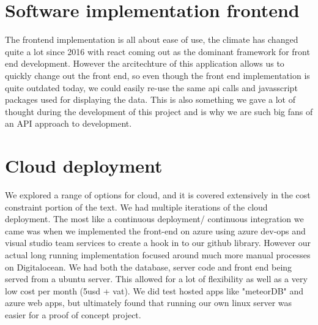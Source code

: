 \documentclass[]{uiophd}
\begin{document}
\section{Software implementation frontend}
The frontend implementation is all about ease of use, the climate has changed quite a lot since 2016 with react coming out as the dominant framework for front end development. However the arcitechture of this application allows us to quickly change out the front end, so even though the front end implementation is quite outdated today, we could easily re-use the same api calls and javasscript packages used for displaying the data. This is also something we gave a lot of thought during the development of this project and is why we are such big fans of an API approach to development. 
\section{Cloud deployment}
We explored a range of options for cloud, and it is covered extensively in the cost constraint portion of the text. We had multiple iterations of the cloud deployment. The most like a continuous deployment/ continuous integration we came was when we implemented the front-end on azure using azure dev-ops and visual studio team services to create a hook in to our github library. However our actual long running implementation focused around much more manual processes on Digitalocean. We had both the database, server code and front end being served from a ubuntu server. This allowed for a lot of flexibility as well as a very low cost per month (5usd + vat). We did test hosted apps like "meteorDB" and azure web apps, but ultimately found that running our own linux server was easier for a proof of concept project.
\\\\
\end{document}
